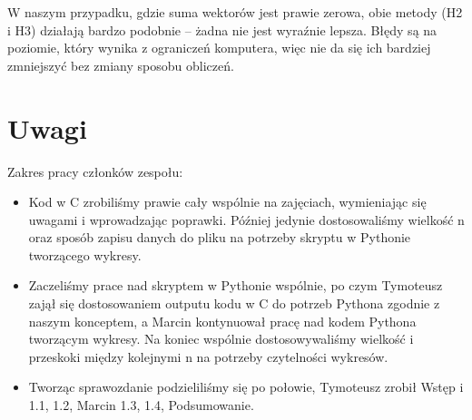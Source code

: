 \documentclass[a4paper,12pt]{article}
\begin{document}
W naszym przypadku, gdzie suma wektorów jest prawie zerowa, obie metody (H2 i H3) działają bardzo podobnie – żadna nie jest wyraźnie lepsza. Błędy są na poziomie, który wynika z ograniczeń komputera, więc nie da się ich bardziej zmniejszyć bez zmiany sposobu obliczeń. 

\section*{Uwagi}
Zakres pracy członków zespołu:
\begin{itemize}
    \item Kod w C zrobiliśmy prawie cały wspólnie na zajęciach, wymieniając się uwagami i wprowadzając poprawki. Później jedynie dostosowaliśmy wielkość n oraz sposób zapisu danych do pliku na potrzeby skryptu w Pythonie tworzącego wykresy.
    \item Zaczeliśmy prace nad skryptem w Pythonie wspólnie, po czym Tymoteusz zajął się dostosowaniem outputu kodu w C do potrzeb Pythona zgodnie z naszym konceptem, a Marcin kontynuował pracę nad kodem Pythona tworzącym wykresy. Na koniec wspólnie dostosowywaliśmy wielkość i przeskoki między kolejnymi n na potrzeby czytelności wykresów.
    \item Tworząc sprawozdanie podzieliliśmy się po połowie, Tymoteusz zrobił Wstęp i 1.1, 1.2, Marcin 1.3, 1.4, Podsumowanie.
\end{itemize}
\end{document}
